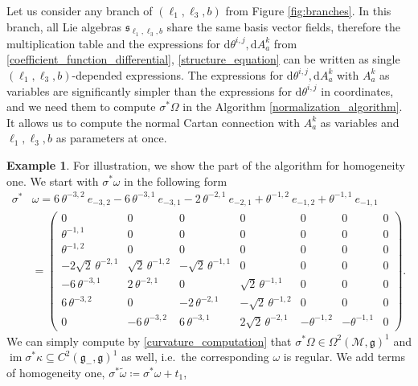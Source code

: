 \documentclass{amsart}
\theoremstyle{plain}
\theoremstyle{definition}
\newtheorem*{example}{Example}
\theoremstyle{remark}
\newcommand{\mc}[1]{\mathcal{#1}}
\newcommand{\mfk}[1]{\mathfrak{#1}}
\newcommand{\on}[1]{\operatorname{#1}}
\newcommand{\di}{\mathrm{d}}
\begin{document}
Let us consider any branch of $(\ell_1,\ell_3,b)$ from Figure \ref{fig:branches}. In this branch, all Lie algebras $\mfk{s}_{\ell_1,\ell_3,b}$ share the same basis vector fields, therefore the multiplication table and the expressions for $\di \theta^{i,j}, \di A_a^k$ from \eqref{coefficient_function_differential}, \eqref{structure_equation} can be written as single $(\ell_1,\ell_3,b)$-depended expressions. The expressions for $\di \theta^{i,j}, \di A_a^k$ with $A_a^k$ as variables are significantly simpler than the expressions for $\di \theta^{i,j}$ in coordinates, and we need them to compute $\sigma^* \Omega$ in the Algorithm \ref{normalization_algorithm}. It allows us to compute the normal Cartan connection with $A_a^k$ as variables and $\ell_1,\ell_3,b$ as parameters at once.

\begin{example}
    For illustration, we show the part of the algorithm for homogeneity one. We start with $\sigma^*\omega$ in the following form
    \begin{equation*}
    \begin{aligned}
        \sigma^*&\omega =  6\, \theta^{-3,2}\ e_{-3,2} - 6\, \theta^{-3,1}\ e_{-3,1} - 2\, \theta^{-2,1}\ e_{-2,1} + \theta^{-1,2}\ e_{-1,2} + \theta^{-1,1}\ e_{-1,1}\\
        &=
        \begin{pmatrix}
            0 & 0 & 0 & 0 & 0 & 0 & 0 \\
            \theta^{-1,1} & 0 & 0 & 0 & 0 & 0 & 0 \\
            \theta^{-1,2} & 0 & 0 & 0 & 0 & 0 & 0 \\
            -2\sqrt{2}\,\theta^{-2,1} & \sqrt{2}\, \theta^{-1,2} & -\sqrt{2}\, \theta^{-1,1}    & 0 & 0 & 0 & 0 \\
            -6\, \theta^{-3,1} & 2\, \theta^{-2,1} & 0 & \sqrt{2}\, \theta^{-1,1} & 0 & 0 &     0 \\
            6\, \theta^{-3,2} & 0 & -2\, \theta^{-2,1} & -\sqrt{2}\, \theta^{-1,2} & 0 & 0 &    0 \\
            0 & -6\, \theta^{-3,2} & 6\, \theta^{-3,1} & 2\sqrt{2}\, \theta^{-2,1} & -\theta^{-1,2} & -\theta^{-1,1} & 0
        \end{pmatrix}.
    \end{aligned}
    \end{equation*}
    We can simply compute by \eqref{curvature_computation} that $\sigma^*\Omega \in \Omega^2(\mc{M},\mfk{g})^1$ and $\on{im} \sigma^*\kappa \subseteq C^2(\mfk{g}_-,\mfk{g})^1$ as well, i.e.~the corresponding $\omega$ is regular. We add terms of homogeneity one, $\sigma^*\widetilde\omega \coloneqq \sigma^*\omega + t_1$,

\end{example}
\end{document}
